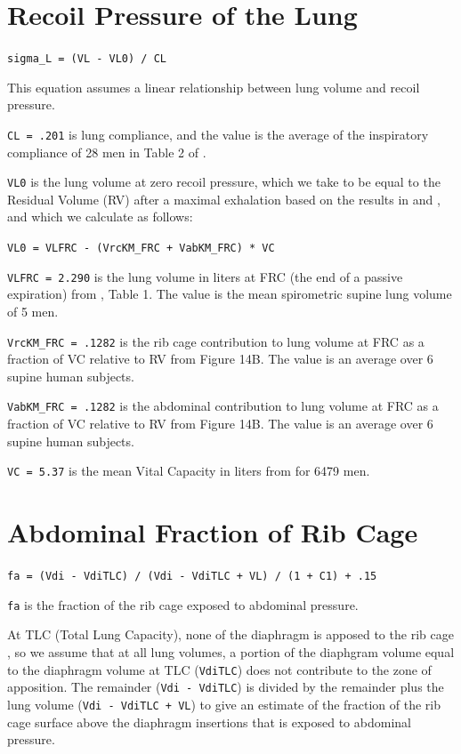 \documentclass[12pt,openany,oneside]{book}
\newcommand{\ticode}[1]{\texttt{#1}}
\begin{document}
\section{Recoil Pressure of the Lung}
\label{Recoil Pressure of the Lung}

\ticode{sigma\_L = (VL - VL0) / CL}

This equation assumes a linear relationship between lung volume and
recoil pressure. 

\verb~CL = .201~ is lung compliance, and the value is the average of
the inspiratory compliance of 28 men in Table 2 of
\citet{Permutt01091960}.

\verb~VL0~ is the lung volume at
zero recoil pressure, which we take to be equal to the Residual Volume
(RV) after a maximal exhalation based on the results in
\citet{Permutt01091960} and \citet{Harris2005}, and which we calculate
as follows:

\ticode{VL0 = VLFRC - (VrcKM\_FRC + VabKM\_FRC) * VC}

\verb~VLFRC = 2.290~ is the lung volume in liters at FRC (the end of a
passive expiration) from \citet{Cluzel01052000}, Table 1. The value
is the mean spirometric supine lung volume of 5 men.

\verb~VrcKM_FRC = .1282~ is the rib cage contribution to lung volume
at FRC as a fraction of VC relative to RV from \citet{Konno1967}
Figure 14B. The value is an average over 6 supine human subjects.

\verb~VabKM_FRC = .1282~ is the abdominal contribution to lung volume
at FRC as a fraction of VC relative to RV from \citet{Konno1967}
Figure 14B. The value is an average over 6 supine human subjects.

\verb~VC = 5.37~ is the mean Vital Capacity in liters from
\citet{Roca01061998} for 6479 men.

\section{Abdominal Fraction of Rib Cage}

\ticode{fa = (Vdi - VdiTLC) / (Vdi - VdiTLC + VL) / (1 + C1) + .15}

\verb~fa~ is the fraction of the rib cage exposed to abdominal
pressure.

At TLC (Total Lung Capacity), none of the diaphragm is apposed to the
rib cage \citep{Mead01091982}, so we assume that at all lung volumes,
a portion of the diaphgram volume equal to the diaphragm volume at TLC
(\verb~VdiTLC~) does not contribute to the zone of apposition. The
remainder (\verb~Vdi - VdiTLC~) is divided by the remainder plus the
lung volume (\verb~Vdi - VdiTLC + VL~) to give an estimate of the
fraction of the rib cage surface above the diaphragm insertions that
is exposed to abdominal pressure.
\end{document}
